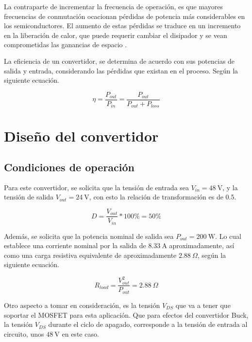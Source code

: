 \documentclass[journal]{IEEEtran}
\begin{document}
\setlength{\parskip}{1em}

La contraparte de incrementar la frecuencia de operación, es que mayores frecuencias de conmutación
ocacionan pérdidas de potencia más considerables en los semiconductores. El aumento de estas pérdidas
se traduce en un incremento en la liberación de calor, que puede requerir cambiar el disipador y se vean
comprometidas las ganancias de espacio \cite{hart2011power}.

\setlength{\parskip}{1em}

La eficiencia de un convertidor, se determina de acuerdo con sus potencias de salida y entrada, considerando
las pérdidas que existan en el proceso. Según la siguiente ecuación.

\begin{equation}
    \eta = \frac{P_{out}}{P_{in}} = \frac{P_{out}}{P_{out} + P_{loss}}
\end{equation}


\section{Diseño del convertidor}

\subsection{Condiciones de operación}
Para este convertidor, se solicita que la tensión de entrada sea \emph{$V_{in} = 48~\mathrm{V}$}, y la tensión 
de salida \emph{$V_{out} = 24~\mathrm{V}$}, con esto la relación de transformación es de 0.5.

\begin{equation}
    D = \frac{V_{out}}{V_{in}} * 100\% = 50\%
\end{equation}

Además, se solicita que la potencia nominal de salida sea \emph{$P_{out} = 200~\mathrm{W}$}. Lo cual establece una
corriente nominal por la salida de \emph{$8.33~\mathrm{A}$} aproximadamente, así como una carga resistiva 
equivalente de aproximadamente \emph{$2.88~\Omega$}, según la siguiente ecuación.

\begin{equation}
    R_{load} = \frac{V_{out}^2}{P_{out}} = 2.88~\Omega
\end{equation}

Otro aspecto a tomar en consideración, es la tensión \emph{$V_{DS}$} que va a tener que soportar el MOSFET para esta
aplicación. Que para efectos del convertidor Buck, la tensión \emph{$V_{DS}$} durante el ciclo de apagado, 
corresponde a la tensión de entrada al circuito, unos \emph{$48~\mathrm{V}$} en este caso.
\end{document}
